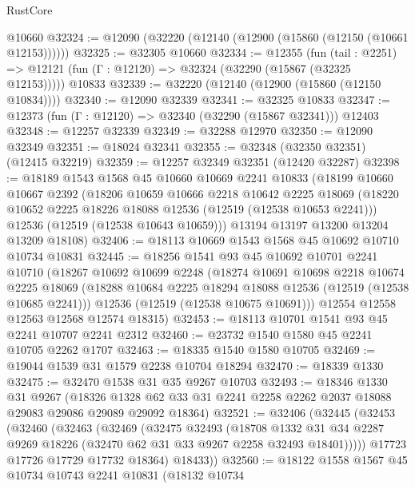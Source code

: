 \begin{lexlean}{RustCore}
\begin{coremodule}
    @10660
@32324 := @12090 (@32220 (@12140 (@12900 (@15860 (@12150 (@10661 @12153))))))
@32325 := @32305 @10660
@32334 := @12355
    (fun (tail : @2251) => @12121 (fun (Γ : @12120) => @32324 (@32290 (@15867 (@32325 @12153)))))
    @10833
@32339 := @32220 (@12140 (@12900 (@15860 (@12150 @10834))))
@32340 := @12090 @32339
@32341 := @32325 @10833
@32347 := @12373 (fun (Γ : @12120) => @32340 (@32290 (@15867 @32341))) @12403
@32348 := @12257 @32339
@32349 := @32288 @12970
@32350 := @12090 @32349
@32351 := @18024 @32341
@32355 := @32348 (@32350 @32351) (@12415 @32219)
@32359 := @12257 @32349 @32351 (@12420 @32287)
@32398 := @18189
    @1543
    @1568
    @45
    @10660
    @10669
    @2241
    @10833
    (@18199
      @10660
      @10667
      @2392
      (@18206
        @10659
        @10666
        @2218
        @10642
        @2225
        @18069
        (@18220 @10652 @2225 @18226 @18088 @12536 (@12519 (@12538 @10653 @2241)))
        @12536
        (@12519 (@12538 @10643 @10659)))
      @13194
      @13197
      @13200
      @13204
      @13209
      @18108)
@32406 := @18113 @10669 @1543 @1568 @45 @10692 @10710 @10734 @10831
@32445 := @18256
    @1541
    @93
    @45
    @10692
    @10701
    @2241
    @10710
    (@18267
      @10692
      @10699
      @2248
      (@18274
        @10691
        @10698
        @2218
        @10674
        @2225
        @18069
        (@18288 @10684 @2225 @18294 @18088 @12536 (@12519 (@12538 @10685 @2241)))
        @12536
        (@12519 (@12538 @10675 @10691)))
      @12554
      @12558
      @12563
      @12568
      @12574
      @18315)
@32453 := @18113 @10701 @1541 @93 @45 @2241 @10707 @2241 @2312
@32460 := @23732 @1540 @1580 @45 @2241 @10705 @2262 @1707
@32463 := @18335 @1540 @1580 @10705
@32469 := @19044 @1539 @31 @1579 @2238 @10704 @18294
@32470 := @18339 @1330
@32475 := @32470 @1538 @31 @35 @9267 @10703
@32493 := @18346
    @1330
    @31
    @9267
    (@18326 @1328 @62 @33 @31 @2241 @2258 @2262 @2037 @18088 @29083 @29086 @29089 @29092 @18364)
@32521 := @32406
    (@32445
      (@32453
        (@32460
          (@32463
            (@32469
              (@32475
                @32493
                (@18708
                  @1332
                  @31
                  @34
                  @2287
                  @9269
                  @18226
                  (@32470 @62 @31 @33 @9267 @2258 @32493 @18401)))))
          @17723
          @17726
          @17729
          @17732
          @18364)
        @18433))
@32560 := @18122
    @1558
    @1567
    @45
    @10734
    @10743
    @2241
    @10831
    (@18132
      @10734

\end{coremodule}
\end{lexlean}
